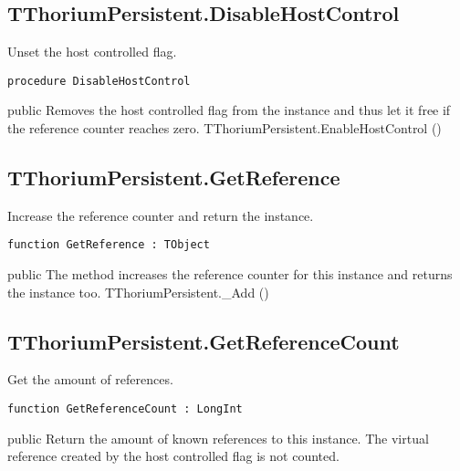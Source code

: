 \subsection{TThoriumPersistent.DisableHostControl}
\label{thoriumcorepkg:thorium:tthoriumpersistent:disablehostcontrol}
\begin{FPCList}
\Synopsis
Unset the host controlled flag.\Declaration 

\begin{verbatim}
procedure DisableHostControl
\end{verbatim}
\Visibility
public
\Description
Removes the host controlled flag from the instance and thus let it free if the reference counter reaches zero.\SeeAlso
TThoriumPersistent.EnableHostControl (\pageref{thoriumcorepkg:thorium:tthoriumpersistent:enablehostcontrol})\end{FPCList}
\subsection{TThoriumPersistent.GetReference}
\label{thoriumcorepkg:thorium:tthoriumpersistent:getreference}
\begin{FPCList}
\Synopsis
Increase the reference counter and return the instance.\Declaration 

\begin{verbatim}
function GetReference : TObject
\end{verbatim}
\Visibility
public
\Description
The method increases the reference counter for this instance and returns the instance too.\SeeAlso
TThoriumPersistent.\_Add (\pageref{thoriumcorepkg:thorium:tthoriumpersistent})\end{FPCList}
\subsection{TThoriumPersistent.GetReferenceCount}
\label{thoriumcorepkg:thorium:tthoriumpersistent:getreferencecount}
\begin{FPCList}
\Synopsis
Get the amount of references.\Declaration 

\begin{verbatim}
function GetReferenceCount : LongInt
\end{verbatim}
\Visibility
public
\Description
Return the amount of known references to this instance. The virtual reference created by the host controlled flag is not counted.\end{FPCList}
